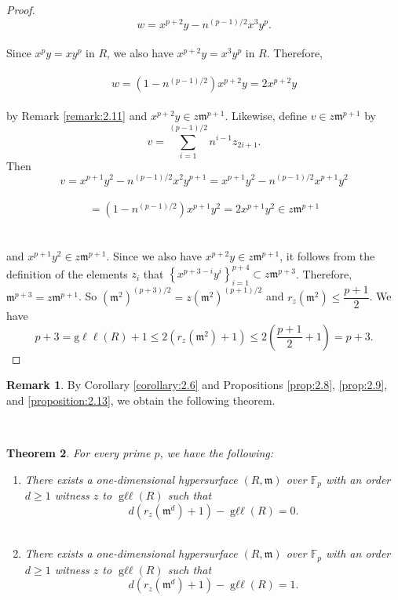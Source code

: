 \documentclass{amsart}
\newtheorem{theorem}{Theorem}[section]
\theoremstyle{definition}
\theoremstyle{definition}
\newtheorem{remark}[theorem]{Remark}
\numberwithin{equation}{section}
\theoremstyle{definition}
\DeclareMathOperator{\Gll}{g\ell\ell}
\begin{document}
{\begin{proof}
\[
w= x^{p+2}y -n^{(p-1)/2}x^3 y^p.
\] \text{}\\ Since $x^p y = x y^p$ in $R$, we also have $x^{p+2}y=x^3 y^p$ in $R$. Therefore, \\\\
\[
w=\left(1-n^{(p-1)/2} \right)x^{p+2}y=2 x^{p+2}y
\] \text{}\\ by Remark \ref{remark:2.11} and $x^{p+2}y \in z \mathfrak{m}^{p+1}$. Likewise, define $v \in z \mathfrak{m}^{p+1}$ by \\
\[
v=\sum\limits_{i=1}^{(p-1)/2} n^{i-1}z_{2i+1}.
\] Then 
\[
v = x^{p+1} y^2 - n^{(p-1)/2} x^2 y^{p+1} = x^{p+1} y^2 - n^{(p-1)/2} x^{p+1}y^2 
\] \text{}\\
\[
=\left(1-n^{(p-1)/2} \right) x^{p+1}y^2=2 x^{p+1}y^2 \in z \mathfrak{m}^{p+1}
\] \text{}\\\\ and $x^{p+1}y^2 \in z \mathfrak{m}^{p+1}$. Since we also have $x^{p+2}y \in z \mathfrak{m}^{p+1}$, it follows from the definition of the elements $z_i$ that $\left\{x^{p+3-i}y^i \right\}_{i=1}^{p+4} \subset z\mathfrak{m}^{p+3}$. Therefore, $\mathfrak{m}^{p+3}=z \mathfrak{m}^{p+1}$. So $\left( \mathfrak{m}^2\right)^{(p+3)/2}=z \left(\mathfrak{m}^2 \right)^{(p+1)/2}$ and $r_{z}(\mathfrak{m}^2) \leq \dfrac{p+1}{2}$. We have \\
\[
p+3=\text{g}\ell\ell(R)+1 \leq 2 \left(r_{z}(\mathfrak{m}^2) + 1 \right) \leq 2 \left(\dfrac{p+1}{2} + 1 \right)=p+3.
\] \end{proof}
\text{}
\begin{remark}
By Corollary \ref{corollary:2.6} and Propositions \ref{prop:2.8}, \ref{prop:2.9}, and \ref{proposition:2.13}, we obtain the following theorem.
\end{remark}\text{}\\
\begin{theorem}\label{theorem:2.16}
For every prime $p$, we have the following:\\
\begin{enumerate}
\item[(a)] There exists a one-dimensional hypersurface $(R,\mathfrak{m})$ over $\mathbb{F}_p$ with an order $d \geq 1$ witness $z$ to $\Gll(R)$ such that 
\[
d(r_{z}(\mathfrak{m}^d)+1)-\Gll(R)=0.
\]
\\
\item[(b)] There exists a one-dimensional hypersurface $(R,\mathfrak{m})$ over $\mathbb{F}_p$ with an order $d \geq 1$ witness $z$ to $\Gll(R)$ such that 
\[
d(r_{z}(\mathfrak{m}^d)+1)-\Gll(R)=1.
\]
\end{enumerate}
\end{theorem}
\begin{center}

\end{center}}
\end{document}
